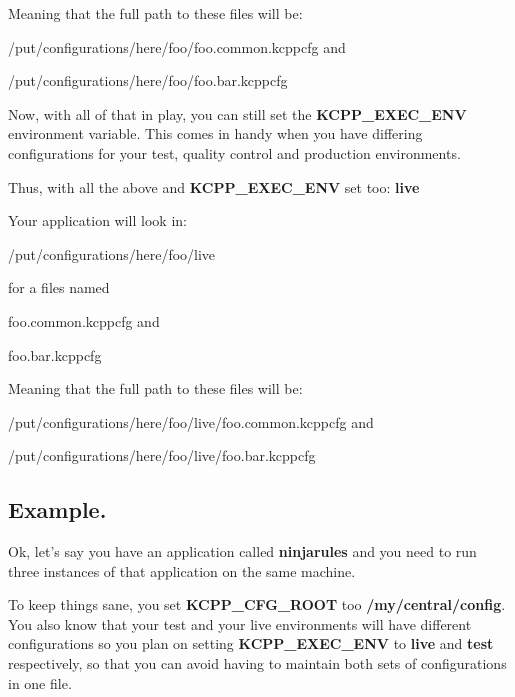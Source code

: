 Meaning that the full path to these files will be\-:
\begin{DoxyItemize}
\item /put/configurations/here/foo/foo.common.\-kcppcfg and
\item /put/configurations/here/foo/foo.bar.\-kcppcfg
\end{DoxyItemize}

Now, with all of that in play, you can still set the {\bfseries K\-C\-P\-P\-\_\-\-E\-X\-E\-C\-\_\-\-E\-N\-V} environment variable. This comes in handy when you have differing configurations for your test, quality control and production environments.

Thus, with all the above and {\bfseries K\-C\-P\-P\-\_\-\-E\-X\-E\-C\-\_\-\-E\-N\-V} set too\-: {\bfseries live}

Your application will look in\-:
\begin{DoxyItemize}
\item /put/configurations/here/foo/live
\item for a files named
\begin{DoxyItemize}
\item foo.\-common.\-kcppcfg and
\item foo.\-bar.\-kcppcfg
\end{DoxyItemize}
\end{DoxyItemize}

Meaning that the full path to these files will be\-:
\begin{DoxyItemize}
\item /put/configurations/here/foo/live/foo.common.\-kcppcfg and
\item /put/configurations/here/foo/live/foo.bar.\-kcppcfg
\end{DoxyItemize}

\subsection*{Example.}

Ok, let's say you have an application called {\bfseries ninjarules} and you need to run three instances of that application on the same machine.

To keep things sane, you set {\bfseries K\-C\-P\-P\-\_\-\-C\-F\-G\-\_\-\-R\-O\-O\-T} too {\bfseries /my/central/config}. You also know that your test and your live environments will have different configurations so you plan on setting {\bfseries K\-C\-P\-P\-\_\-\-E\-X\-E\-C\-\_\-\-E\-N\-V} to {\bfseries live} and {\bfseries test} respectively, so that you can avoid having to maintain both sets of configurations in one file.

